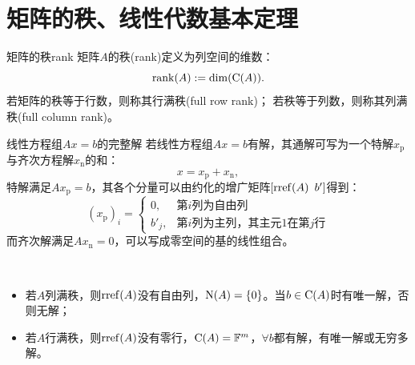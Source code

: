 \section{矩阵的秩、线性代数基本定理}

\begin{definition}{矩阵的秩}{rank}
	矩阵$A$的秩(rank)定义为列空间的维数：%
	\begin{equation}\label{eq:la-matrix-rank}
		\operatorname{rank}(A) := \dim(\operatorname{C}(A)).
	\end{equation}
	若矩阵的秩等于行数，则称其行满秩(full row rank)；
	若秩等于列数，则称其列满秩(full column rank)。
\end{definition}
\begin{theorem}
	{线性方程组$Ax = b$的完整解}{}
	若线性方程组$Ax = b$有解，其通解可写为一个特解$x_{\mathrm p}$与齐次方程解$x_{\mathrm n}$的和：
	\begin{equation}\label{eq:la-inhomogeneous-solutions}
		x = x_{\mathrm p} + x_{\mathrm n},
	\end{equation}
	特解满足$Ax_{\mathrm p} = b$，其各个分量可以由约化的增广矩阵$[\operatorname{rref}(A)\enspace b']$得到：
	\begin{equation}\label{eq:la-particular-solution-components}
		(x_{\mathrm p})_i = \begin{cases}
			0,&\text{第$i$列为自由列}\\
			b'_j,&\text{第$i$列为主列，其主元1在第$j$行}
		\end{cases}
	\end{equation}
	而齐次解满足$Ax_{\mathrm n} = 0$，可以写成零空间的基的线性组合。
\end{theorem}
\begin{corollary}
	~
	\begin{itemize}
		\item 若$A$列满秩，则$\operatorname{rref}(A)$没有自由列，$\operatorname{N}(A) = \{0\}$。当$b \in \operatorname{C}(A)$时有唯一解，否则无解；
		\item 若$A$行满秩，则$\operatorname{rref}(A)$没有零行，$\operatorname{C}(A) = \mathbb{F}^m$，$\forall b$都有解，有唯一解或无穷多解。
	\end{itemize}
\end{corollary}
